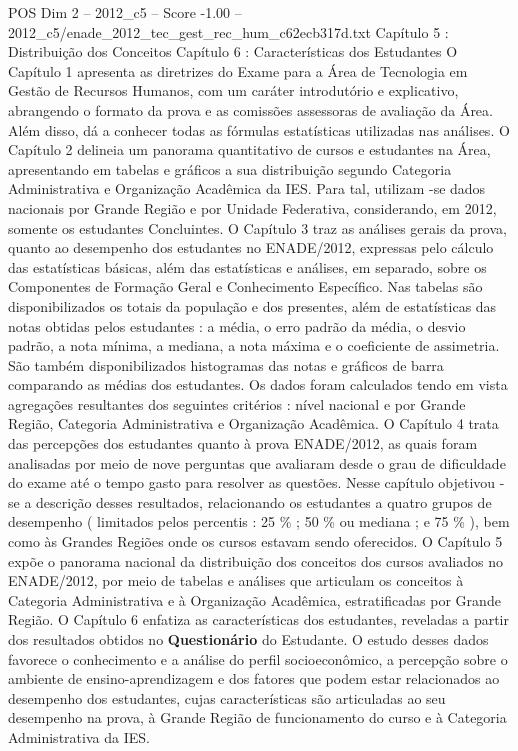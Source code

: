 \begin{textsample}{POS Dim 2 – 2012\_c5 – Score -1.00 – 2012\_c5/enade\_2012\_tec\_gest\_rec\_hum\_c62ecb317d.txt}  \label{ex:f2_pos_357}
Capítulo 5 : Distribuição dos Conceitos Capítulo 6 : Características dos Estudantes O Capítulo 1 apresenta as diretrizes do Exame para a Área de Tecnologia em Gestão de Recursos Humanos, com um caráter introdutório e explicativo, abrangendo o formato da prova e as comissões assessoras de avaliação da Área.
Além disso, dá a conhecer todas as fórmulas estatísticas utilizadas nas análises.
O Capítulo 2 delineia um panorama quantitativo de cursos e estudantes na Área, apresentando em tabelas e gráficos a sua distribuição segundo Categoria Administrativa e Organização Acadêmica da IES.
Para tal, utilizam -se dados nacionais por Grande Região e por Unidade Federativa, considerando, em 2012, somente os estudantes Concluintes.
O Capítulo 3 traz as análises gerais da prova, quanto ao desempenho dos estudantes no ENADE/2012, expressas pelo cálculo das estatísticas básicas, além das estatísticas e análises, em separado, sobre os Componentes de Formação Geral e Conhecimento Específico.
Nas tabelas são disponibilizados os totais da população e dos presentes, além de estatísticas das notas obtidas pelos estudantes : a média, o erro padrão da média, o desvio padrão, a nota mínima, a mediana, a nota máxima e o coeficiente de assimetria.
São também disponibilizados histogramas das notas e gráficos de barra comparando as médias dos estudantes.
Os dados foram calculados tendo em vista agregações resultantes dos seguintes critérios : nível nacional e por Grande Região, Categoria Administrativa e Organização Acadêmica.
O Capítulo 4 trata das percepções dos estudantes quanto à prova ENADE/2012, as quais foram analisadas por meio de nove perguntas que avaliaram desde o grau de dificuldade do exame até o tempo gasto para resolver as questões.
Nesse capítulo objetivou -se a descrição desses resultados, relacionando os estudantes a quatro grupos de desempenho ( limitados pelos percentis : 25 \% ; 50 \% ou mediana ; e 75 \% ), bem como às Grandes Regiões onde os cursos estavam sendo oferecidos.
O Capítulo 5 expõe o panorama nacional da distribuição dos conceitos dos cursos avaliados no ENADE/2012, por meio de tabelas e análises que articulam os conceitos à Categoria Administrativa e à Organização Acadêmica, estratificadas por Grande Região.
O Capítulo 6 enfatiza as características dos estudantes, reveladas a partir dos resultados obtidos no \textbf{Questionário} do Estudante.
O estudo desses dados favorece o conhecimento e a análise do perfil socioeconômico, a percepção sobre o ambiente de ensino-aprendizagem e dos fatores que podem estar relacionados ao desempenho dos estudantes, cujas características são articuladas ao seu desempenho na prova, à Grande Região de funcionamento do curso e à Categoria Administrativa da IES.

\end{textsample}
